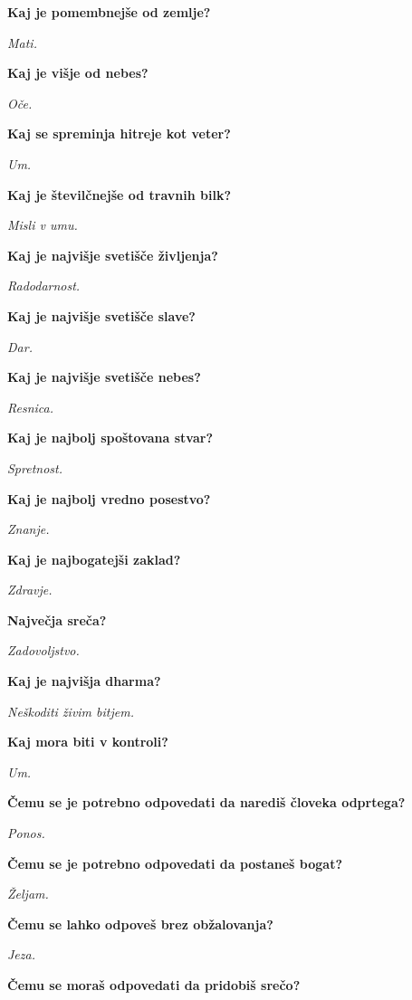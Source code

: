 \vspace*{1.2cm} \textbf{Kaj je pomembnejše od zemlje?} 

\textit{Mati.}\medskip 

\textbf{Kaj je višje od nebes?} 

\textit{Oče.}\medskip 

\textbf{Kaj se spreminja hitreje kot veter?} 

\textit{Um.}\medskip 

\textbf{Kaj je številčnejše od travnih bilk?} 

\textit{Misli v umu.}\medskip 

\textbf{Kaj je najvišje svetišče življenja?} 

\textit{Radodarnost.}\medskip 

\textbf{Kaj je najvišje svetišče slave?} 

\textit{Dar.}\medskip 

\textbf{Kaj je najvišje svetišče nebes?} 

\textit{Resnica.}\medskip 

\textbf{Kaj je najbolj spoštovana stvar?} 

\textit{Spretnost.}\medskip 

\textbf{Kaj je najbolj vredno posestvo?} 

\textit{Znanje.}\medskip 

\textbf{Kaj je najbogatejši zaklad?} 

\textit{Zdravje.}\medskip 

\textbf{Največja sreča?} 

\textit{Zadovoljstvo.}\medskip 

\textbf{Kaj je najvišja dharma?} 

\textit{Neškoditi živim bitjem.}\medskip 

\textbf{Kaj mora biti v kontroli?} 

\textit{Um.}\medskip 

\textbf{Čemu se je potrebno odpovedati da narediš človeka odprtega?} 

\textit{Ponos.}\medskip\vfill\pagebreak\vspace*{1.2cm} 

\textbf{Čemu se je potrebno odpovedati da postaneš bogat?} 

\textit{Željam.}\medskip 

\textbf{Čemu se lahko odpoveš brez obžalovanja?} 

\textit{Jeza.}\medskip 

\textbf{Čemu se moraš odpovedati da pridobiš srečo?} 

